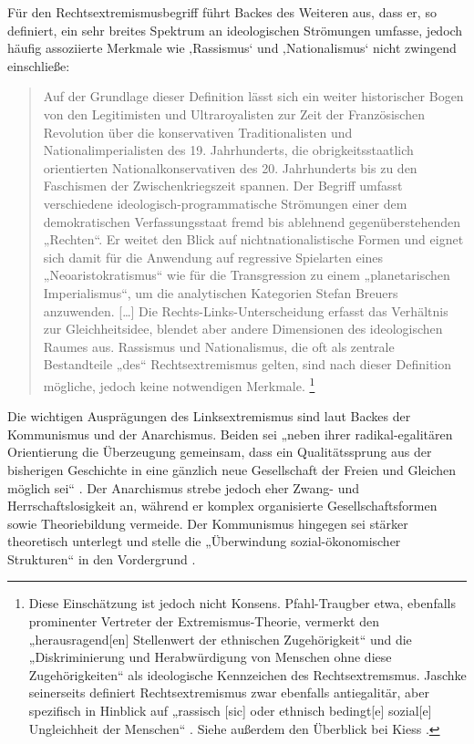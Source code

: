 Für den Rechtsextremismusbegriff führt Backes des Weiteren aus, dass er, so definiert, ein sehr breites Spektrum an ideologischen Strömungen umfasse, jedoch häufig assoziierte Merkmale wie ‚Rassismus` und ‚Nationalismus` nicht zwingend einschließe:
\largerpage[-2]
\begin{quote}
Auf der Grundlage dieser Definition lässt sich ein weiter historischer Bogen von den Legitimisten und Ultraroyalisten zur Zeit der Französischen Revolution über die konservativen Traditionalisten und Nationalimperialisten des 19. Jahrhunderts, die obrigkeitsstaatlich orientierten Nationalkonservativen des 20. Jahrhunderts bis zu den Faschismen der Zwischenkriegszeit spannen. Der Begriff umfasst verschiedene ideologisch-programmatische Strömungen einer dem demokratischen Verfassungsstaat fremd bis ablehnend gegenüberstehenden „Rechten``. Er weitet den Blick auf nichtnationalistische Formen und eignet sich damit für die Anwendung auf regressive Spielarten eines „Neoaristokratismus`` wie für die Transgression zu einem „planetarischen Imperialismus``, um die analytischen Kategorien Stefan Breuers anzuwenden. {[}\ldots{]} Die Rechts-Links-Unterscheidung erfasst das Verhältnis zur Gleichheitsidee, blendet aber andere Dimensionen des ideologischen Raumes aus. Rassismus und Nationalismus, die oft als zentrale Bestandteile „des`` Rechtsextremismus gelten, sind nach dieser Definition mögliche, jedoch keine notwendigen Merkmale. \autocite[112]{backesExtremistischeIdeologien2018}\footnote{Diese Einschätzung ist jedoch nicht Konsens. Pfahl-Traugber etwa, ebenfalls prominenter Vertreter der Extremismus-Theorie, vermerkt den „herausragend{[}en{]} Stellenwert der ethnischen Zugehörigkeit`` und die „Diskriminierung und Herabwürdigung von Menschen ohne diese Zugehörigkeiten`` \autocite[50]{pfahl-traughberErkenntnisgewinnVergleichendenExtremismusforschung2017} als ideologische Kennzeichen des Rechtsextremsmus. Jaschke seinerseits definiert Rechtsextremismus zwar ebenfalls antiegalitär, aber spezifisch in Hinblick auf „rassisch {[}sic{]} oder ethnisch bedingt{[}e{]} sozial{[}e{]} Ungleichheit der Menschen`` \autocite*[30]{jaschkeRechtsextremismusUndFremdenfeindlichkeit2001}. Siehe außerdem den Überblick bei Kiess \autocite*{kiessRechtsextremExtremistischDemokratisch2011}.}
\end{quote}

Die wichtigen Ausprägungen des Linksextremismus sind laut Backes der Kommunismus und der Anarchismus. Beiden sei „neben ihrer radikal-egalitären Orientierung die Überzeugung gemeinsam, dass ein Qualitätssprung aus der bisherigen Geschichte in eine gänzlich neue Gesellschaft der Freien und Gleichen möglich sei`` \autocite[127]{backesExtremistischeIdeologien2018}. Der Anarchismus strebe jedoch eher Zwang- und Herrschaftslosigkeit an, während er komplex organisierte Gesellschaftsformen sowie Theoriebildung vermeide. Der Kommunismus hingegen sei stärker theoretisch unterlegt und stelle die „Überwindung sozial-ökonomischer Strukturen`` in den Vordergrund \autocite[127]{backesExtremistischeIdeologien2018}.

